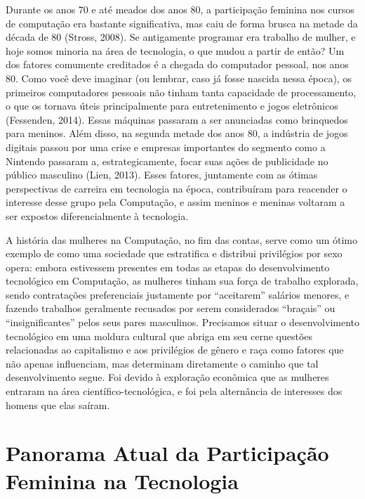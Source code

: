 Durante os anos 70 e até meados dos anos 80, a participação feminina nos cursos de computação era bastante significativa, mas caiu de forma brusca na metade da década de 80 (Stross, 2008). Se antigamente programar era trabalho de mulher, e hoje somos minoria na área de tecnologia, o que mudou a partir de então? Um dos fatores comumente creditados é a chegada do computador pessoal, nos anos 80. Como você deve imaginar (ou lembrar, caso já fosse nascida nessa época), os primeiros computadores pessoais não tinham tanta capacidade de processamento, o que os tornava úteis principalmente para entretenimento e jogos eletrônicos (Fessenden, 2014). Essas máquinas passaram a ser anunciadas como brinquedos para meninos. Além disso, na segunda metade dos anos 80, a indústria de jogos digitais passou por uma crise e empresas importantes do segmento como a Nintendo passaram a, estrategicamente, focar suas ações de publicidade no público masculino (Lien, 2013). Esses fatores, juntamente com as ótimas perspectivas de carreira em tecnologia na época, contribuíram para reacender o interesse desse grupo pela Computação, e assim meninos e meninas voltaram a ser expostos diferencialmente à tecnologia. 

A história das mulheres na Computação, no fim das contas, serve como um ótimo exemplo de como uma sociedade que estratifica e distribui privilégios por sexo opera: embora estivessem presentes em todas as etapas do desenvolvimento tecnológico em Computação, as mulheres tinham sua força de trabalho explorada, sendo contratações preferenciais justamente por “aceitarem” salários menores, e fazendo trabalhos geralmente recusados por serem considerados “braçais” ou “insignificantes” pelos seus pares masculinos. Precisamos situar o desenvolvimento tecnológico em uma moldura cultural que abriga em seu cerne questões relacionadas ao capitalismo e aos privilégios de gênero e raça como fatores que não apenas influenciam, mas determinam diretamente o caminho que tal desenvolvimento segue. Foi devido à exploração econômica que as mulheres entraram na área científico-tecnológica, e foi pela alternância de interesses dos homens que elas saíram.

\section{Panorama Atual da Participação Feminina na Tecnologia}

